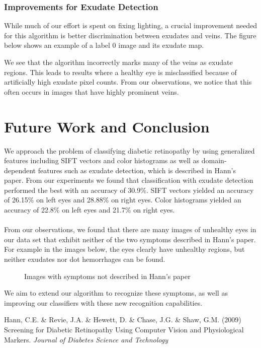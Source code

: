 \documentclass{article} %
\begin{document}
\subsubsection{Improvements for Exudate Detection}
While much of our effort is spent on fixing lighting, a crucial improvement needed for this algorithm is better discrimination between exudates and veins. The figure below shows an example of a label 0 image and its exudate map.

\begin{figure}[htp]
  \centering
  \quad
\end{figure}

 We see that the algorithm incorrectly marks many of the veins as exudate regions. This leads to results where a healthy eye is misclassified because of artificially high exudate pixel counts. From our observations, we notice that this often occurs in images that have highly prominent veins.

\section{Future Work and Conclusion}
We approach the problem of classifying diabetic retinopathy by using generalized features including SIFT vectors and color histograms as well as domain-dependent features such as exudate detection, which is described in Hann's paper. From our experiments we found that classification with exudate detection performed the best with an accuracy of 30.9\%. SIFT vectors yielded an accuracy of 26.15\% on left eyes and 28.88\% on right eyes. Color histograms yielded an accuracy of 22.8\% on left eyes and 21.7\% on right eyes. \\ \\
From our observations, we found that there are many images of unhealthy eyes in our data set that exhibit neither of the two symptoms described in Hann's paper. For example in the images below, the eyes clearly have unhealthy regions, but neither exudates nor dot hemorrhages can be found. 

\begin{figure}[htp]
  \centering
  \quad
\caption{Images with symptoms not described in Hann's paper}
\end{figure}

We aim to extend our algorithm to recognize these symptoms, as well as improving our classifiers with these new recognition capabilities.

\begin{thebibliography}{9}
Hann, C.E. \& Revie, J.A. \& Hewett, D. \& Chase, J.G. \& Shaw, G.M.
(2009) Screening for Diabetic Retinopathy Using Computer Vision and Physiological Markers. 
{\it Journal of Diabetes Science and Technology}
\end{thebibliography}
\end{document}
